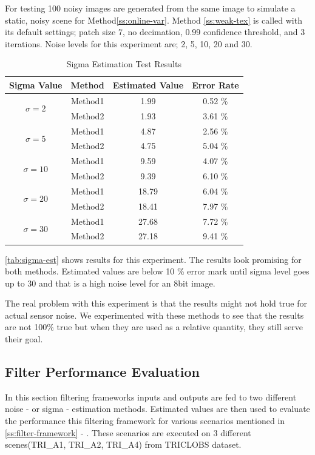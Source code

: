 \documentclass[10pt,twocolumn,letterpaper]{article}
\begin{document}
For testing 100 noisy images are generated from the same image to simulate a static, noisy scene for Method\ref{ss:online-var}. Method \ref{ss:weak-tex} is called with its default settings; patch size 7, no decimation, 0.99 confidence threshold, and 3 iterations. Noise levels for this experiment are; 2, 5, 10, 20 and 30.

\begin{table}[h!]
	\centering
	\caption{Sigma Estimation Test Results}
	\label{tab:sigma-est}
	\begin{tabular}{cccc}
		\toprule
		\bfseries Sigma Value & \bfseries Method & \bfseries Estimated Value & \bfseries Error Rate\\
		\midrule
		\multirow{2}{*}{\(\sigma=2\)} & Method1 & 1.99 & 0.52 \% \\
		& Method2 & 1.93 & 3.61 \% \\
		\multirow{2}{*}{\(\sigma=5\)} & Method1 & 4.87 & 2.56 \% \\
		& Method2 & 4.75 & 5.04 \% \\
		\multirow{2}{*}{\(\sigma=10\)} & Method1 & 9.59 & 4.07 \% \\
		& Method2 & 9.39 & 6.10 \% \\
		\multirow{2}{*}{\(\sigma=20\)} & Method1 & 18.79 & 6.04 \% \\
		& Method2 & 18.41 & 7.97 \% \\
		\multirow{2}{*}{\(\sigma=30\)} & Method1 & 27.68 & 7.72 \% \\
		& Method2 & 27.18 & 9.41 \% \\
		\bottomrule
	\end{tabular}
\end{table}

\autoref{tab:sigma-est} shows results for this experiment. The results look promising for both methods. Estimated values are below 10 \% error mark until sigma level goes up to 30 and that is a high noise level for an 8bit image.

The real problem with this experiment is that the results might not hold true for actual sensor noise. We experimented with these methods to see that the results are not 100\% true but when they are used as a relative quantity, they still serve their goal.

\subsection{Filter Performance Evaluation}
In this section filtering frameworks inputs and outputs are fed to two different noise - or sigma - estimation methods. Estimated values are then used to evaluate the performance this filtering framework for various scenarios mentioned in  \ref{ss:filter-framework} -  . These scenarios are executed on 3 different scenes(TRI\_A1, TRI\_A2, TRI\_A4) from TRICLOBS\cite{triclobs} dataset. 
\end{document}
